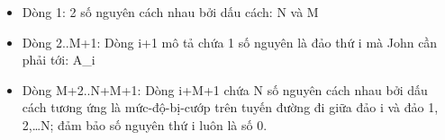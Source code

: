 \begin{itemize}
	\item     Dòng 1: 2 số nguyên cách nhau bởi dấu cách: N và M   
	\item     Dòng 2..M+1: Dòng i+1 mô tả chứa 1 số nguyên là đảo thứ i         mà John cần phải tới: A\_i   
	\item     Dòng M+2..N+M+1: Dòng i+M+1 chứa N số nguyên cách nhau bởi dấu cách         tương ứng là mức-độ-bị-cướp trên tuyến đường đi giữa đảo i và          đảo 1, 2,…N; đảm bảo số nguyên thứ i luôn là số 0.   
\end{itemize}